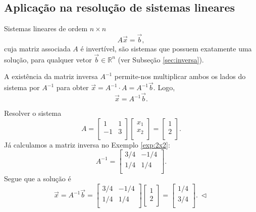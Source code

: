 \documentclass[../livro.tex]{subfiles}  %
\begin{document}
\subsection{Aplicação na resolução de sistemas lineares}


Sistemas lineares de ordem $n \times n$
\begin{equation}
A \vec{x} = \vec{b},
\end{equation} cuja matriz associada $A$ é invertível, são sistemas que possuem exatamente uma solução, para qualquer vetor $\vec{b} \in \mathbb{R}^n$ (ver Subseção \ref{sec:inversa}).

A existência da matriz inversa $A^{-1}$ permite-nos multiplicar ambos os lados do sistema por $A^{-1}$ para obter $\vec{x} = A^{-1} \cdot A = A^{-1} \vec{b}.$ Logo,
\begin{equation}
\boxed{\vec{x} = A^{-1} \vec{b}.}
\end{equation}


\begin{example}
	Resolver o sistema
	\begin{equation}
	A = \left[
	\begin{array}{cc}
	1 & 1  \\
	-1 & 3 \\
	\end{array}
	\right] \left[
	\begin{array}{c}
	x_1  \\
	x_2 \\
	\end{array}
	\right] =
	\left[
	\begin{array}{c}
	1  \\
	2 \\
	\end{array}
	\right].
	\end{equation} Já calculamos a matriz inversa no Exemplo \ref{exp:2x2}:
	\begin{equation}
	A^{-1}  =
	\left[
	\begin{array}{cc}
	3/4 & -1/4  \\
	1/4 & 1/4 \\
	\end{array}
	\right].
	\end{equation} Segue que a solução é
	\begin{equation}
	\vec{x} = A^{-1} \vec{b} =
	\left[
	\begin{array}{cc}
	3/4 & -1/4  \\
	1/4 & 1/4 \\
	\end{array}
	\right]\left[
	\begin{array}{c}
	1  \\
	2 \\
	\end{array}
	\right] =
	\left[
	\begin{array}{c}
	1/4 \\
	3/4 \\
	\end{array}
	\right]. \ \lhd
	\end{equation}
\end{example}
\end{document}
